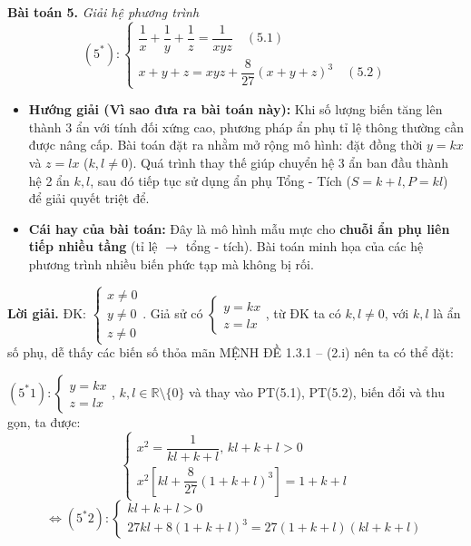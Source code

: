 \documentclass[12pt]{report}
\begin{document}
\vspace{0.4cm}
\noindent \textbf{Bài toán 5.} \textit{Giải hệ phương trình}
\[
(5^*): \begin{cases}
\dfrac{1}{x} + \dfrac{1}{y} + \dfrac{1}{z} = \dfrac{1}{xyz} \quad (5.1) \\[10pt]
x + y + z = xyz + \dfrac{8}{27}(x + y + z)^3 \quad (5.2)
\end{cases}
\]
\begin{itemize}
    \item[\textbf{1.}] \textbf{Hướng giải (Vì sao đưa ra bài toán này):} 
    Khi số lượng biến tăng lên thành 3 ẩn với tính đối xứng cao, phương pháp ẩn phụ tỉ lệ thông thường cần được nâng cấp. Bài toán đặt ra nhằm mở rộng mô hình: đặt đồng thời $y = kx$ và $z = lx$ ($k, l \neq 0$). Quá trình thay thế giúp chuyển hệ 3 ẩn ban đầu thành hệ 2 ẩn $k, l$, sau đó tiếp tục sử dụng ẩn phụ Tổng - Tích ($S = k+l, P = kl$) để giải quyết triệt để.

    \item[\textbf{2.}] \textbf{Cái hay của bài toán:} 
    Đây là mô hình mẫu mực cho \textbf{chuỗi ẩn phụ liên tiếp nhiều tầng} (tỉ lệ $\rightarrow$ tổng - tích). Bài toán minh họa của các hệ phương trình nhiều biến phức tạp mà không bị rối.
\end{itemize}
\vspace{0.2cm}
\noindent \textbf{Lời giải.} ĐK: $\begin{cases} x \neq 0 \\ y \neq 0 \\ z \neq 0 \end{cases}$. Giả sử có $\begin{cases} y = kx \\ z = lx \end{cases}$, từ ĐK ta có $k, l \neq 0$, với $k, l$ là ẩn số phụ, dễ thấy các biến số thỏa mãn MỆNH ĐỀ 1.3.1 -- (2.i) nên ta có thể đặt:

\vspace{0.2cm}
\noindent $(5^*1): \begin{cases} y = kx \\ z = lx \end{cases}$, $k, l \in \mathbb{R} \setminus \{0\}$ và thay vào PT(5.1), PT(5.2), biến đổi và thu gọn, ta được:
\[
\begin{cases}
x^2 = \dfrac{1}{kl + k + l}, \, kl + k + l > 0 \\[10pt]
x^2 \left[ kl + \dfrac{8}{27}(1 + k + l)^3 \right] = 1 + k + l
\end{cases}
\]
\[
\Leftrightarrow (5^*2): \begin{cases}
kl + k + l > 0 \\
27kl + 8(1 + k + l)^3 = 27(1 + k + l)(kl + k + l)
\end{cases}
\]
\end{document}
